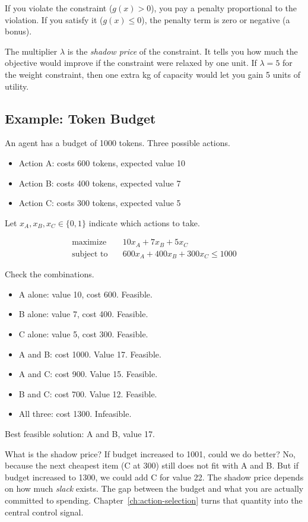 If you violate the constraint ($g(x) > 0$), you pay a penalty proportional to the violation. If you satisfy it ($g(x) \leq 0$), the penalty term is zero or negative (a bonus).

The multiplier $\lambda$ is the \textit{shadow price} of the constraint. It tells you how much the objective would improve if the constraint were relaxed by one unit. If $\lambda = 5$ for the weight constraint, then one extra kg of capacity would let you gain 5 units of utility.

\subsection{Example: Token Budget}

An agent has a budget of 1000 tokens. Three possible actions.
\begin{itemize}
\item Action A: costs 600 tokens, expected value 10
\item Action B: costs 400 tokens, expected value 7
\item Action C: costs 300 tokens, expected value 5
\end{itemize}

Let $x_A, x_B, x_C \in \{0, 1\}$ indicate which actions to take.

\begin{align*}
\text{maximize} \quad & 10 x_A + 7 x_B + 5 x_C \\
\text{subject to} \quad & 600 x_A + 400 x_B + 300 x_C \leq 1000
\end{align*}

Check the combinations.
\begin{itemize}
\item A alone: value 10, cost 600. Feasible.
\item B alone: value 7, cost 400. Feasible.
\item C alone: value 5, cost 300. Feasible.
\item A and B: cost 1000. Value 17. Feasible.
\item A and C: cost 900. Value 15. Feasible.
\item B and C: cost 700. Value 12. Feasible.
\item All three: cost 1300. Infeasible.
\end{itemize}

Best feasible solution: A and B, value 17.

What is the shadow price? If budget increased to 1001, could we do better? No, because the next cheapest item (C at 300) still does not fit with A and B. But if budget increased to 1300, we could add C for value 22. The shadow price depends on how much \emph{slack} exists. The gap between the budget and what you are actually committed to spending. Chapter~\ref{ch:action-selection} turns that quantity into the central control signal.

